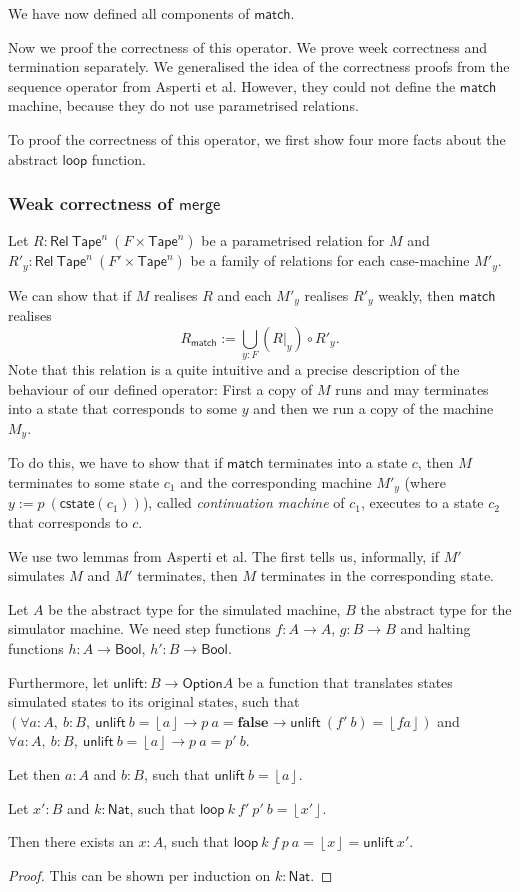 \documentclass{psartcl}
\newcommand{\MS}[1]{\textsf{#1}}
\newcommand{\from}{:}
\renewcommand{\to}{\rightarrow}
\newcommand{\Option}{\MS{Option}}
\newcommand{\Bool}{\MS{Bool}}
\newcommand{\Nat}{\MS{Nat}}
\newcommand{\Some}[1]{\left\lfloor #1\right\rfloor}
\newcommand{\false}{\mathbf{false}}
\newcommand{\Tape}{\MS{Tape}}
\newcommand{\Tapes}[1]{\Tape^{#1}}
\newcommand{\at}[2][]{#1|_{#2}}
\newcommand{\Rel}{\mathsf{Rel}}
\begin{document}
We have now defined all components of $\MS{match}$.

Now we proof the correctness of this operator.  We prove week correctness and termination separately.
We generalised the idea of the correctness proofs from the sequence operator from Asperti et al.
However, they could not define the $\MS{match}$ machine, because they do not use parametrised relations.

To proof the correctness of this operator, we first show four more facts about the abstract $\MS{loop}$ function.

\subsubsection{Weak correctness of $\MS{merge}$}

Let $R:\Rel~{\Tapes{n}}~(F \times \Tapes{n})$ be a parametrised relation for $M$ and $R'_y:\Rel~\Tapes{n}~(F' \times \Tapes{n})$ be a family
of relations for each case-machine $M'_y$.

We can show that if $M$ realises $R$ and each $M'_y$ realises $R'_y$ weakly, then $\MS{match}$ realises
$$R_\MS{match} := \bigcup_{y:F} (R \at y) \circ R'_y.$$
Note that this relation is a quite intuitive and a precise description of the behaviour of our defined operator:  First a copy of $M$ runs and may
terminates into a state that corresponds to some $y$ and then we run a copy of the machine $M_y$.

To do this, we have to show that if $\MS{match}$ terminates into a state $c$, then $M$ terminates to some state $c_1$ and the corresponding machine
$M'_y$ (where $y := p~\left( \MS{cstate}(c_1) \right)$), called \emph{continuation machine} of $c_1$, executes to a state $c_2$ that corresponds to
$c$.

We use two lemmas from Asperti et al.  The first tells us, informally, if $M'$ simulates $M$ and $M'$ terminates, then $M$ terminates in the
corresponding state.

\begin{lemma}[Unlift $\MS{loop}$]
  \label{lem:loop-unlift}
  Let $A$ be the abstract type for the simulated machine, $B$ the abstract type for the simulator machine.
  We need step functions $f \from A \to A$, $g \from B \to B$ and halting functions $h \from A \to \Bool$, $h' \from B \to \Bool$.

  Furthermore, let $\MS{unlift} \from B \to \Option A$ be a function that translates states simulated states to its original states, such that
  $(\forall a: A,~b: B,~\MS{unlift}~b = \Some a \rightarrow p~a = \false \rightarrow \MS{unlift}~(f'~b) = \Some{f a})$
  and
  $\forall a: A,~b: B,~\MS{unlift}~b = \Some a \rightarrow p~a = p'~b$.

  Let then $a:A$ and $b:B$, such that $\MS{unlift}~b = \Some{a}$.

  Let $x':B$ and $k:\Nat$, such that $\MS{loop}~k~f'~p'~b = \Some{x'}$.

  Then there exists an $x:A$, such that $\MS{loop}~k~f~p~a = \Some x = \MS{unlift}~x'$.
\end{lemma}
\begin{proof}
  This can be shown per induction on $k:\Nat$.
\end{proof}
\end{document}
